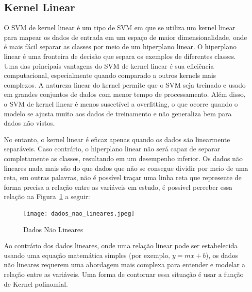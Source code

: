 \documentclass[12pt,oneside,a4paper,chapter=TITLE,
			   english,brazil]{abntex2}
\begin{document}
\subsection{Kernel Linear}





O SVM de kernel linear é um tipo de SVM em que se utiliza um kernel linear para mapear os dados de entrada em um espaço de maior dimensionalidade, onde é mais fácil separar as classes por meio de um hiperplano linear. O hiperplano linear é uma fronteira de decisão que separa os exemplos de diferentes classes.  Uma das principais vantagens do SVM de kernel linear é sua eficiência computacional, especialmente quando comparado a outros kernels mais complexos. A natureza linear do kernel permite que o SVM seja treinado e usado em grandes conjuntos de dados com menor tempo de processamento. Além disso, o SVM de kernel linear é menos suscetível a overfitting, o que ocorre quando o modelo se ajusta muito aos dados de treinamento e não generaliza bem para dados não vistos.

No entanto, o kernel linear é eficaz apenas quando os dados são linearmente separáveis. Caso contrário, o hiperplano linear não será capaz de separar completamente as classes, resultando em um desempenho inferior. Os dados não lineares nada mais são do que dados que não  se consegue dividir por meio de  uma reta, em outras palavras, não é possível traçar uma linha reta que represente de forma precisa a relação entre as variáveis em estudo, é possível perceber essa relação na Figura~\ref{fig:imagem} a seguir:

\begin{figure}[ht]
  \centering
\caption[Dados Não Lineares]{Dados Não Lineares}
  \texttt{[image: dados\_nao\_lineares.jpeg]}

  \label{fig:imagem}
\end{figure}
\begin{flushleft}
\vspace{-1.5em}
\centering
{}
\end{flushleft}



Ao contrário dos dados lineares, onde uma relação linear pode ser estabelecida usando uma equação matemática simples (por exemplo, $y = mx + b$), os dados não lineares requerem uma abordagem mais complexa para entender e modelar a relação entre as variáveis. Uma forma de contornar essa situação é  
usar a função de Kernel polinomial. 
\end{document}
